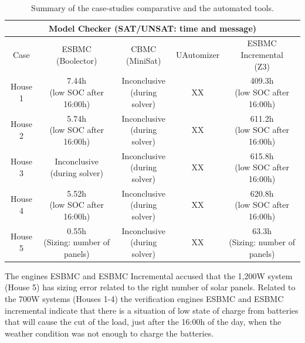 \documentclass[runningheads]{llncs}
\begin{document}
\begin{table}
\centering
\caption{Summary of the case-studies comparative and the automated tools.}\label{tab1}
\begin{tabular}{|c|c|c|c|c|}
\hline
\hline
\multicolumn{5}{|c|}{Model Checker (SAT/UNSAT: time and message)}\\
\hline
Case &  \makecell{ESBMC \\(Boolector)} & \makecell{CBMC\\(MiniSat)} & UAutomizer & \makecell{ESBMC Incremental\\(Z3)}\\
\hline
\hline
House 1 &  \makecell{7.44h \\(low SOC after 16:00h)} & \makecell{Inconclusive \\(during solver)} & XX & \makecell{409.3h \\ (low SOC after 16:00h)}\\
\hline
House 2 &  \makecell{5.74h \\(low SOC after 16:00h)} & \makecell{Inconclusive \\(during solver)} & XX & \makecell{611.2h \\ (low SOC after 16:00h)}\\
\hline
House 3 & \makecell{Inconclusive \\(during solver)} & \makecell{Inconclusive \\(during solver)} & XX & \makecell{615.8h \\ (low SOC after 16:00h)}\\
\hline
House 4 & \makecell{5.52h \\(low SOC after 16:00h)} & \makecell{Inconclusive \\(during solver)} & XX & \makecell{620.8h \\ (low SOC after 16:00h)}\\
\hline
House 5 & \makecell{0.55h \\(Sizing: number of panels)} & \makecell{Inconclusive \\(during solver)} & XX & \makecell{63.3h \\ (Sizing: number of panels)}\\
\hline
\hline
\end{tabular}
\end{table}

The engines ESBMC and ESBMC Incremental accused that the 1,200W system (House 5) has sizing error related to the right number of solar panels. Related to the 700W systems (Houses 1-4) the verification engines ESBMC and ESBMC incremental indicate that there is a situation of low state of charge from batteries that will cause the cut of the load, just after the 16:00h of the day, when the weather condition was not enough to charge the batteries.
\end{document}
